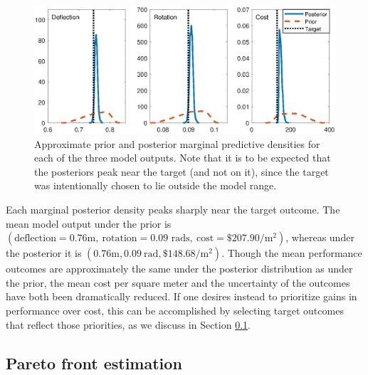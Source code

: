\documentclass[12pt]{article}
\begin{document}
\begin{figure}
\centering
\includegraphics[scale=0.8]{FIG_prior_vs_posterior_dist}
\caption{Approximate prior and posterior marginal predictive densities for each of the three model outputs. Note that it is to be expected that the posteriors peak near the target (and not on it), since the target was intentionally chosen to lie outside the model range.}
\label{fig:prior_post_pred_comp}
\end{figure}
%
Each marginal posterior density peaks sharply near the target outcome.
%
The mean model output under the prior is $(\text{deflection}=0.76\mathrm m,\ \text{rotation}=0.09\text{ rads},\ \text{cost}=\$207.90/\mathrm m^2)$, whereas under the posterior it is $(0.76\mathrm m,0.09\ \mathrm{rad},\$148.68/\mathrm m^2)$.
%
Though the mean performance outcomes are approximately the same under the posterior distribution as under the prior, the mean cost per square meter and the uncertainty of the outcomes have both been dramatically reduced.
%
If one desires instead to prioritize gains in performance over cost, this can be accomplished by selecting target outcomes that reflect those priorities, as we discuss in Section \ref{removing_cal_pars}. 

\subsection{Pareto front estimation}\label{removing_cal_pars}

\end{document}
